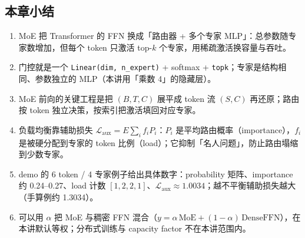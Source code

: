 \subsection{本章小结}
\begin{enumerate}
\item MoE 把 Transformer 的 FFN 换成「路由器 + 多个专家 MLP」：总参数随专家数增加，但每个 token 只激活 top-$k$ 个专家，用稀疏激活换容量与吞吐。
\item 门控就是一个 \texttt{Linear(dim, n\_expert)} + softmax + \texttt{topk}；专家是结构相同、参数独立的 MLP（本讲用「乘数 4」的隐藏层）。
\item MoE 前向的关键工程是把 $(B,T,C)$ 展平成 token 流 $(S,C)$ 再还原；路由按 token 独立决策，按索引把激活填回对应专家。
\item 负载均衡靠辅助损失 $\mathcal{L}_{\text{aux}}=E\sum_i f_iP_i$：$P_i$ 是平均路由概率（importance），$f_i$ 是被硬分配到专家的 token 比例（load）；它抑制「名人问题」，防止路由塌缩到少数专家。
\item demo 的 6 token / 4 专家例子给出具体数字：probability 矩阵、importance 约 0.24--0.27、load 计数 $[1,2,2,1]$、$\mathcal{L}_{\text{aux}}\approx1.0034$；越不平衡辅助损失越大（手算例约 1.3034）。
\item 可以用 $\alpha$ 把 MoE 与稠密 FFN 混合（$y=\alpha\,\mathrm{MoE}+(1-\alpha)\,\mathrm{DenseFFN}$），在本讲默认等权；分布式训练与 capacity factor 不在本讲范围内。
\end{enumerate}
